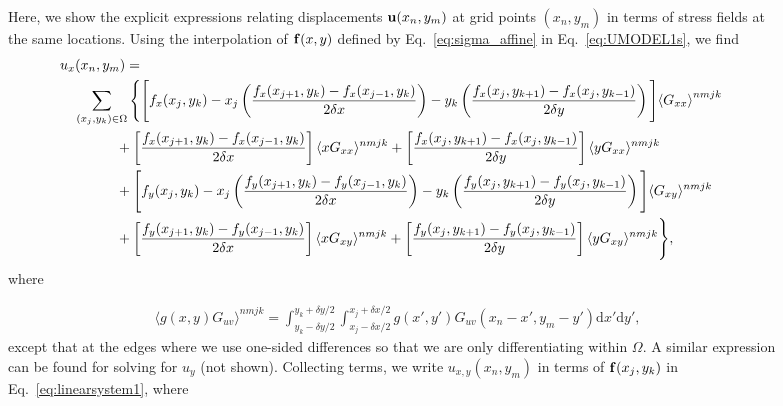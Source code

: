 \documentclass[aps,prl,reprint,twocolumn,groupedaddress,showpacs]{revtex4}
\def\dd{\mbox{d}}
\def\f{{\bf f}}
\def\u{{\bf u}}
\begin{document}
\begin{figure}
\begin{widetext}
Here, we show the explicit expressions relating displacements $\u(x_{n}, y_{m})$ at 
grid points $(x_{n},y_{m})$ in terms of stress fields at the same locations. Using 
the interpolation of $\f(x,y)$ defined by Eq.~\ref{eq:sigma_affine} in 
Eq.~\ref{eq:UMODEL1s}, we find
%
\begin{align}
\lefteqn{u_x(x_n,y_m) =}  \nonumber\\
 & \quad \sum_{(x_j,y_k)\in\Omega} \Bigg\{ \Bigg[f_{x}(x_j,y_k)
- x_j\left(\frac{f_{x}(x_{j+1},y_k) - f_{x}(x_{j-1},y_k)}{2\delta x}\right)
 -y_k\left( \frac{f_{x}(x_j,y_{k+1}) -
f_{x}(x_j,y_{k-1})}{2\delta y}\right) \Bigg]{\langle G_{xx} \rangle}^{nmjk} \nonumber \\
& \qquad\qquad +\left[ \frac{f_{x}(x_{j+1},y_k) -
f_{x}(x_{j-1},y_k)}{2\delta x}\right]\langle xG_{xx} \rangle^{nmjk} 
+ \left[  \frac{f_{x}(x_j,y_{k+1}) - f_{x}(x_j,y_{k-1}) }{2\delta y} \right]
\langle yG_{xx} \rangle^{nmjk}\nonumber\\
&\qquad\qquad + \Bigg[f_{y}(x_j,y_k)-x_j\left(\frac{f_{y}(x_{j+1},y_k)-
f_{y}(x_{j-1},y_k) }{2\delta x}\right)-y_k\left( \frac{f_{y}(x_j,y_{k+1}) 
-f_{y}(x_j,y_{k-1}) }{2\delta y}\right) \Bigg] \langle G_{xy} \rangle^{nmjk}\nonumber \\
&\qquad\qquad +\left[ \frac{f_{y}(x_{j+1},y_k) - f_{y}(x_{j-1},y_k) }{2\delta x}\right]  
\langle xG_{xy} \rangle^{nmjk} + 
\left[\frac{f_{y}(x_j,y_{k+1}) - 
f_{y}(x_j,y_{k-1}) }{2\delta y}\right]\langle yG_{xy} \rangle^{nmjk} \Bigg\},
\label{eq:ux_decomposed}
\end{align}
%
where

\begin{align}
\langle g(x,y)G_{uv} \rangle^{nmjk} = \int_{y_k-\delta y/2}^{y_k+\delta y/2} 
\int_{x_j-\delta x/2}^{x_j+\delta x/2} g(x',y')
G_{uv}(x_n-x',y_m-y')\dd x'\dd y', \label{eq:G_ave} 
\end{align}
%
except that at the edges where we use one-sided differences so that we
are only differentiating within $\Omega$. A similar expression can be
found for solving for $u_y$ (not shown). Collecting terms, we 
write $u_{x,y}(x_{n},y_{m})$ in terms of $\f(x_{j}, y_{k})$ 
in Eq.~\ref{eq:linearsystem1}, where 


\end{widetext}
\end{figure}
\end{document}
